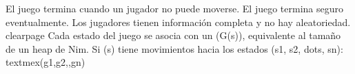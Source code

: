 \markdownRendererUlItem El juego termina cuando un jugador no puede moverse.\markdownRendererUlItemEnd 
\markdownRendererUlItem El juego termina seguro eventualmente.\markdownRendererUlItemEnd 
\markdownRendererUlItem Los jugadores tienen información completa y no hay aleatoriedad.\markdownRendererUlItemEnd 
\markdownRendererUlEndTight \markdownRendererInterblockSeparator
{}\markdownRendererDollarSign{}\markdownRendererBackslash{}clearpage\markdownRendererDollarSign{}\markdownRendererInterblockSeparator
{}
\markdownRendererSectionEnd \markdownRendererSectionBegin
{}\markdownRendererInterblockSeparator
{}Cada estado del juego se asocia con un  (G(s)), equivalente al tamaño de un heap de Nim.\markdownRendererParagraphSeparator
{}Si \markdownRendererDollarSign{}(s)\markdownRendererDollarSign{} tiene movimientos hacia los estados \markdownRendererDollarSign{}(s\markdownRendererUnderscore{}1, s\markdownRendererUnderscore{}2, \markdownRendererBackslash{}dots, s\markdownRendererUnderscore{}n)\markdownRendererDollarSign{}:\markdownRendererParagraphSeparator
{}\markdownRendererDollarSign{}\markdownRendererDollarSign{}\markdownRendererSoftLineBreak
{}\markdownRendererBackslash{}text\markdownRendererLeftBrace{}mex\markdownRendererRightBrace{}(\markdownRendererLeftBrace{}g\markdownRendererUnderscore{}1,g\markdownRendererUnderscore{}2,\markdownRendererEllipsis{},g\markdownRendererUnderscore{}n\markdownRendererRightBrace{})\markdownRendererSoftLineBreak
{}\markdownRendererDollarSign{}\markdownRendererDollarSign{}
\markdownRendererSectionEnd 
\markdownRendererSectionEnd \markdownRendererDocumentEnd